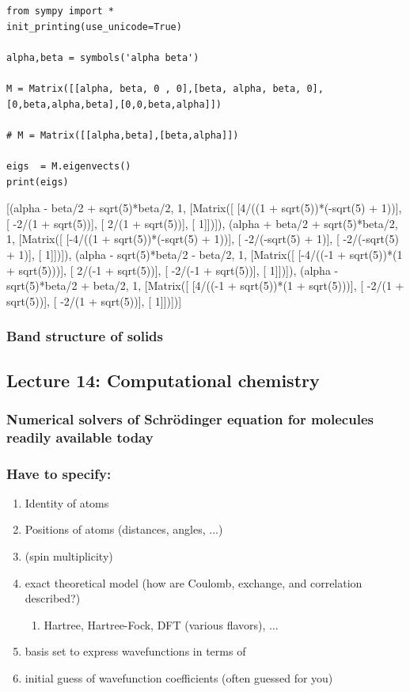 \documentclass[11pt]{article}
\begin{document}
\begin{verbatim}
from sympy import *
init_printing(use_unicode=True)

alpha,beta = symbols('alpha beta')

M = Matrix([[alpha, beta, 0 , 0],[beta, alpha, beta, 0],[0,beta,alpha,beta],[0,0,beta,alpha]])

# M = Matrix([[alpha,beta],[beta,alpha]])

eigs  = M.eigenvects()
print(eigs)
\end{verbatim}

[(alpha - beta/2 + sqrt(5)*beta/2, 1, [Matrix([
[4/((1 + sqrt(5))*(-sqrt(5) + 1))],
[                -2/(1 + sqrt(5))],
[                 2/(1 + sqrt(5))],
[                               1]])]), (alpha + beta/2 + sqrt(5)*beta/2, 1, [Matrix([
[-4/((1 + sqrt(5))*(-sqrt(5) + 1))],
[                -2/(-sqrt(5) + 1)],
[                -2/(-sqrt(5) + 1)],
[                                1]])]), (alpha - sqrt(5)*beta/2 - beta/2, 1, [Matrix([
[-4/((-1 + sqrt(5))*(1 + sqrt(5)))],
[                 2/(-1 + sqrt(5))],
[                -2/(-1 + sqrt(5))],
[                                1]])]), (alpha - sqrt(5)*beta/2 + beta/2, 1, [Matrix([
[4/((-1 + sqrt(5))*(1 + sqrt(5)))],
[                -2/(1 + sqrt(5))],
[                -2/(1 + sqrt(5))],
[                               1]])])]

\subsubsection{Band structure of solids}
\label{sec:org1663aed}

\subsection{Lecture 14: Computational chemistry}
\label{sec:orgb7949b6}
\subsubsection{Numerical solvers of Schr\"{o}dinger equation for molecules readily available today}
\label{sec:org5d8f5b4}
\subsubsection{Have to specify:}
\label{sec:org154af5d}
\begin{enumerate}
\item Identity of atoms
\item Positions of atoms (distances, angles, \(\ldots\))
\item (spin multiplicity)
\item exact theoretical model (how are Coulomb, exchange, and correlation described?)
\begin{enumerate}
\item Hartree, Hartree-Fock, DFT (various flavors), \(\ldots\)
\end{enumerate}

\item basis set to express wavefunctions in terms of
\item initial guess of wavefunction coefficients (often guessed for you)
\end{enumerate}
\end{document}
